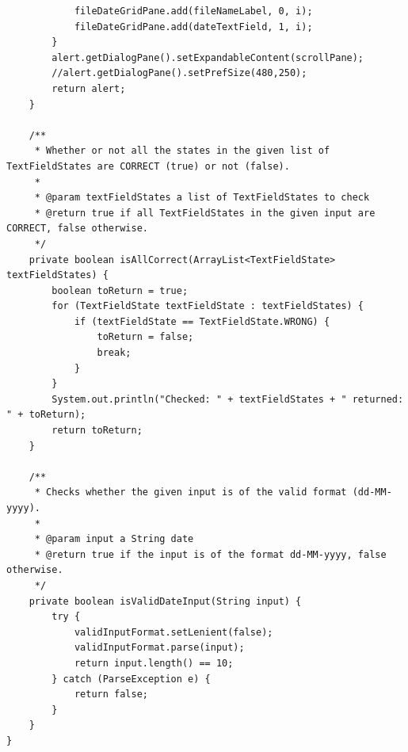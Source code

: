 \begin{lstlisting}
            fileDateGridPane.add(fileNameLabel, 0, i);
            fileDateGridPane.add(dateTextField, 1, i);
        }
        alert.getDialogPane().setExpandableContent(scrollPane);
        //alert.getDialogPane().setPrefSize(480,250);
        return alert;
    }

    /**
     * Whether or not all the states in the given list of TextFieldStates are CORRECT (true) or not (false).
     *
     * @param textFieldStates a list of TextFieldStates to check
     * @return true if all TextFieldStates in the given input are CORRECT, false otherwise.
     */
    private boolean isAllCorrect(ArrayList<TextFieldState> textFieldStates) {
        boolean toReturn = true;
        for (TextFieldState textFieldState : textFieldStates) {
            if (textFieldState == TextFieldState.WRONG) {
                toReturn = false;
                break;
            }
        }
        System.out.println("Checked: " + textFieldStates + " returned: " + toReturn);
        return toReturn;
    }

    /**
     * Checks whether the given input is of the valid format (dd-MM-yyyy).
     *
     * @param input a String date
     * @return true if the input is of the format dd-MM-yyyy, false otherwise.
     */
    private boolean isValidDateInput(String input) {
        try {
            validInputFormat.setLenient(false);
            validInputFormat.parse(input);
            return input.length() == 10;
        } catch (ParseException e) {
            return false;
        }
    }
}
\end{lstlisting}
